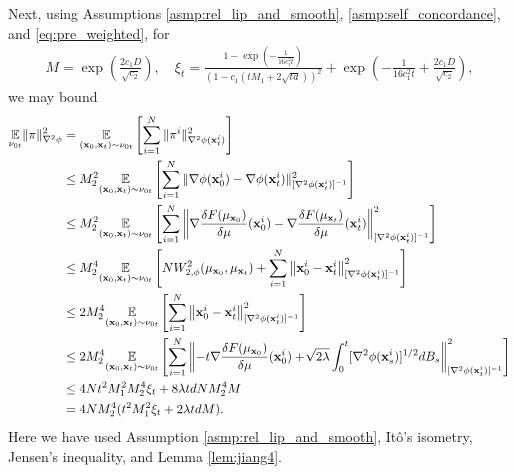 \documentclass{article}
\begin{document}
Next, using Assumptions  \ref{asmp:rel_lip_and_smooth}, \ref{asmp:self_concordance}, and \eqref{eq:pre_weighted}, for
\begin{align*}
M = \exp\left(\frac{2c_1D}{\sqrt{c_2}}\right),\quad \xi_t = \frac{1-\exp(-\frac{1}{16c_1^2t})}{(1-c_1(tM_1 + 2\sqrt{td}))^2} + \exp\left(-\frac{1}{16c_1^2t} + \frac{2c_1D}{\sqrt{c_2}}\right),
\end{align*}
we may bound
\begin{align}
    \underset{\nu_{0t}}{\mathbb{E}}\|\pi\|^2_{\nabla^2\phi}    &=  \underset{(\mathbf{x}_0,\mathbf{x}_t)\sim\nu_{0t}}{\mathbb{E}} \left[\sum_{i=1}^N\|\pi^i\|_{\nabla^2\phi(\mathbf{x}_t^i)}^2\right]\notag \\
    &\le M_2^2\underset{(\mathbf{x}_0,\mathbf{x}_t)\sim\nu_{0t}}{\mathbb{E}}\left[\sum_{i=1}^N\|\nabla\phi(\mathbf{x}_0^i)-\nabla\phi(\mathbf{x}_t^i)\|_{[\nabla^2\phi(\mathbf{x}_t^i)]^{-1}}^2\right]\notag\\
    &\le M_2^2\underset{(\mathbf{x}_0,\mathbf{x}_t)\sim\nu_{0t}}{\mathbb{E}}\left[\sum_{i=1}^N\left\|\nabla\frac{\delta F(\mu_{\mathbf{x}_0})}{\delta\mu}(\mathbf{x}_0^i) - \nabla\frac{\delta F(\mu_{\mathbf{x}_t})}{\delta\mu}(\mathbf{x}_t^i)\right\|_{[\nabla^2\phi(\mathbf{x}_t^i)]^{-1}}^2\right]\notag\\
    &\le M_2^4\underset{(\mathbf{x}_0,\mathbf{x}_t)\sim\nu_{0t}}{\mathbb{E}}\left[NW_{2,\phi}^2(\mu_{\mathbf{x}_0},\mu_{\mathbf{x}_t}) + \sum_{i=1}^N\left\|\mathbf{x}_0^i - \mathbf{x}_t^i\right\|_{[\nabla^2\phi(\mathbf{x}_t^i)]^{-1}}^2\right]\notag\\
    &\le 2M_2^4\underset{(\mathbf{x}_0,\mathbf{x}_t)\sim\nu_{0t}}{\mathbb{E}}\left[ \sum_{i=1}^N\left\|\mathbf{x}_0^i - \mathbf{x}_t^i\right\|_{[\nabla^2\phi(\mathbf{x}_t^i)]^{-1}}^2\right]\notag\\
    &\le 2M_2^4\underset{(\mathbf{x}_0,\mathbf{x}_t)\sim\nu_{0t}}{\mathbb{E}}\left[ \sum_{i=1}^N\left\|-t\nabla \frac{\delta F(\mu_{\mathbf{x}_0})}{\delta\mu}(\mathbf{x}_0^i) + \!\sqrt{2\lambda}\int_0^t[\nabla^2\phi(\mathbf{x}_s^i)]^{1/2}dB_s\right\|_{[\nabla^2\phi(\mathbf{x}_t^i)]^{-1}}^2\right]\notag\\
    &\le 4Nt^2M_1^2M_2^4\xi_t + 8\lambda tdNM_2^4M\notag\\
    &= 4NM_2^4(t^2M_1^2\xi_t + 2\lambda tdM).\label{eq:pi_bound}
\end{align}
Here we have used Assumption \ref{asmp:rel_lip_and_smooth}, It\^o's isometry, Jensen's inequality, and Lemma \ref{lem:jiang4}.
\end{document}
